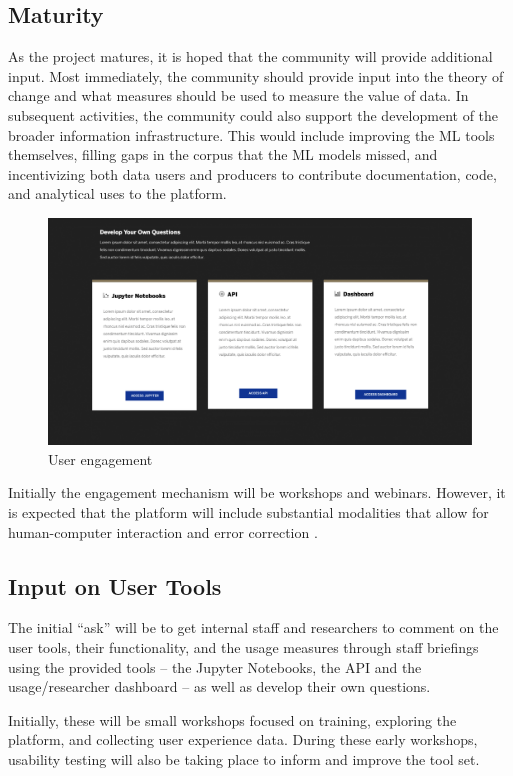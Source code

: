 \documentclass[titlepage, 11pt]{article}
\begin{document}
{\subsection{Maturity}
As the project matures, it is hoped that the community will provide additional input.  Most immediately, the community should provide input into the theory of change and what measures should be used to measure the value of data.  In subsequent activities, the community could also support the development of the broader information infrastructure.  This would include improving the ML tools themselves, filling gaps in the corpus that the ML models missed, and incentivizing both data users and producers to contribute documentation, code, and analytical uses to the platform.
\begin{figure}[ht]
\centering
  \includegraphics[scale=0.30]{user_engagement.png}
  \caption{User engagement}
  \label{fig:user_engagement}
\end{figure}
 
Initially the engagement mechanism will be workshops and webinars.  However, it is expected that the platform will include substantial modalities that allow for human-computer interaction and error correction .


\subsection{Input on User Tools}
The initial “ask” will be to get internal staff and researchers to comment on the user tools, their functionality, and the usage measures through staff briefings using the provided tools – the Jupyter Notebooks, the API and the usage/researcher dashboard – as well as develop their own questions.


Initially, these will be small workshops focused on training, exploring the platform, and collecting user experience data. During these early workshops, usability testing will also be taking place to inform and improve the tool set.

}
\end{document}
